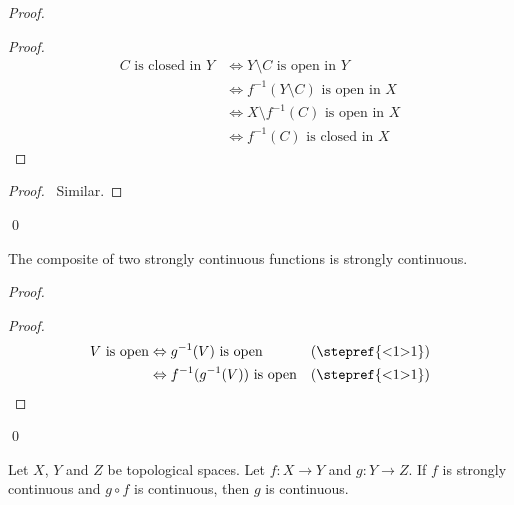 \begin{proof}
  \pf
  \begin{proof}
    \pf
    \begin{align*}
      C \text{ is closed in } Y & \Leftrightarrow Y \setminus C \text{ is
        open in } Y \\
      & \Leftrightarrow f^{-1}(Y \setminus C) \text{ is open in } X \\
      & \Leftrightarrow X \setminus f^{-1}(C) \text{ is open in } X \\
      & \Leftrightarrow f^{-1}(C) \text{ is closed in } X
    \end{align*}
  \end{proof}
  \begin{proof}
    \pf\ Similar.
  \end{proof}
  \qed
\end{proof}

\begin{prop}
  \label{prop:topology:strongly_continuous:composite}
  The composite of two strongly continuous functions is strongly continuous.
\end{prop}

\begin{proof}
  \pf
  \begin{proof}
    \pf
    \begin{align*}
      V \text{ is open} & \Leftrightarrow g^{-1}(V) \text{ is open} &
      (\text{\stepref{<1>1}}) \\
      & \Leftrightarrow f^{-1}(g^{-1}(V)) \text{ is open} &
      (\text{\stepref{<1>1}})
    \end{align*}
  \end{proof}
  \qed
\end{proof}

\begin{prop}
  Let $X$, $Y$ and $Z$ be topological spaces.
  Let $f : X \rightarrow Y$ and $g : Y \rightarrow Z$. If $f$ is strongly
  continuous and $g \circ f$ is continuous, then $g$ is continuous.
\end{prop}

